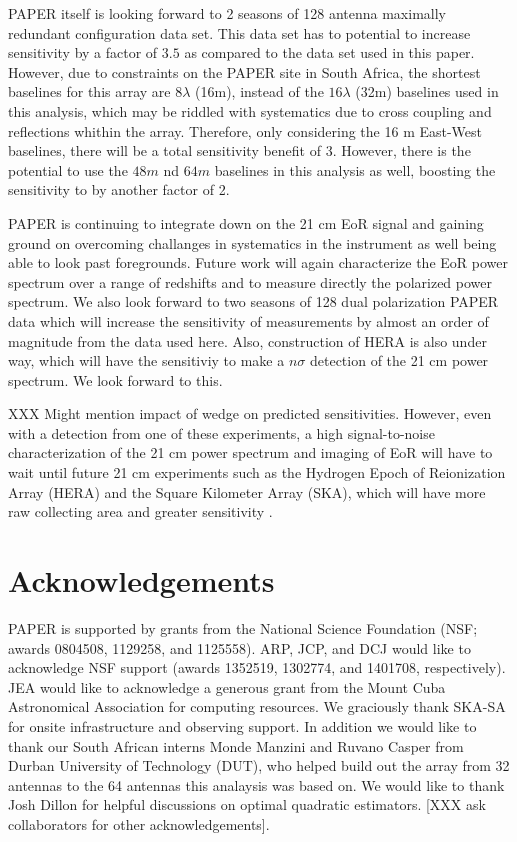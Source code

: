 \documentclass[twocolumn,numberedappendix]{emulateapj} \shorttitle{PSA64}
\begin{document}
PAPER itself is looking forward to 2 seasons of 128 antenna maximally redundant
configuration data set. This data set has to potential to increase  sensitivity
by a factor of $3.5$ as compared to the data set used in this paper. However,
due to constraints on the PAPER site in South Africa, the shortest baselines for
this array are $8\lambda$ (16m), instead of the $16\lambda$ (32m) baselines used
in this analysis, which may be riddled with systematics due to cross coupling
and reflections whithin the array. Therefore, only considering the 16 m
East-West baselines, there will be a total sensitivity benefit of $3$. However,
there is the potential to use the $48m$ nd $64m$ baselines in this analysis as
well, boosting the sensitivity to by another factor of 2. 

PAPER is continuing to integrate down on the 21 cm EoR signal and gaining ground
on overcoming challanges in systematics in the instrument as well being able to
look past foregrounds. Future work will again characterize the EoR power
spectrum over a range of redshifts and to measure directly the polarized power
spectrum. We also look forward to two seasons of 128 dual polarization PAPER
data which will increase the sensitivity of measurements by almost an order of
magnitude from the data used here. Also, construction of HERA is also under way,
which will have the sensitiviy to make a $n\sigma$ detection of the 21 cm power
spectrum. We look forward to this.


XXX Might mention impact of wedge on predicted sensitivities.
However, even with a detection from one of these experiments, a high signal-to-noise characterization of the 21 cm power spectrum and imaging of EoR will have to
wait until future 21 cm experiments such as the Hydrogen Epoch of Reionization
Array (HERA) and the Square Kilometer Array (SKA), which will have more raw
collecting area and greater sensitivity \citep{pober_et_al2014}.

\section{Acknowledgements} 

PAPER is supported by grants from the National Science Foundation (NSF; awards 0804508,
1129258, and 1125558).  ARP, JCP, and DCJ would like to acknowledge NSF support
(awards 1352519, 1302774, and 1401708, respectively).
JEA would like to acknowledge a generous grant from the Mount Cuba Astronomical Association for
computing resources.
We graciously thank SKA-SA for onsite infrastructure and observing support. In
addition we would like to thank our South African interns Monde Manzini and
Ruvano Casper from Durban University of Technology (DUT), who helped build out
the array from 32 antennas to the 64 antennas this analaysis was based on. 
We would like to thank Josh Dillon for helpful discussions on optimal quadratic
estimators. 
[XXX ask collaborators for other acknowledgements].



\end{document}
